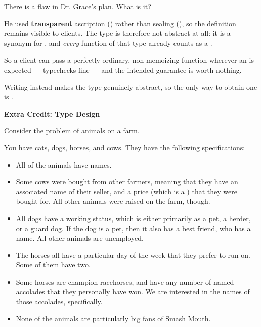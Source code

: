 \begin{parts}
    There is a flaw in Dr. Grace's plan. What is it?

    \begin{solutionorbox}[15em]
      He used \textbf{transparent} ascription (\code{:}) rather than sealing
      (\code{:>}), so the definition  remains
      visible to clients. The type is therefore not abstract at all: it is a
      synonym for , and \textit{every} function of that type
      already counts as a .

      So a client can pass a perfectly ordinary, non-memoizing function wherever
      an  is expected --- 
      typechecks fine --- and the intended guarantee is worth nothing.

      Writing  instead makes the type
      genuinely abstract, so the only way to obtain one is .
    \end{solutionorbox}
\end{parts}

\newpage
{}

\textbf{Extra Credit: Type Design}

Consider the problem of animals on a farm.

You have cats, dogs, horses, and cows. They have the following specifications:
\begin{itemize}
  \item All of the animals have names.
  \item Some cows were bought from other farmers, meaning that they
  have an associated name of their seller, and a price (which is a )
  that they were bought for. All other animals were raised on the farm, though.
  \item All dogs have a working status, which is either primarily as a pet,
  a herder, or a guard dog. If the dog is a pet, then it also has a best friend,
  who has a name. All other animals are unemployed.
  \item The horses all have a particular day of the week that they prefer to
  run on. Some of them have two.
  \item Some horses are champion racehorses, and have any number of named accolades
  that they personally have won. We are interested in the names of those accolades,
  specifically.
  \item None of the animals are particularly big fans of Smash Mouth.
\end{itemize}

